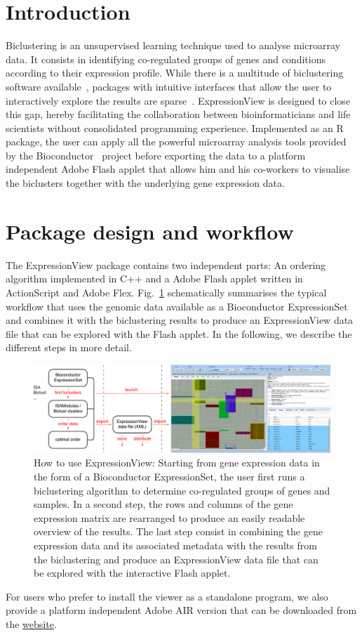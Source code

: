 \documentclass[round]{bioinfo}
\begin{document}
\section{Introduction}
Biclustering is an unsupervised learning technique used to analyse microarray data. It consists in identifying co-regulated groups of genes and conditions according to their expression profile. While there is a multitude of biclustering software available~\citep{madeira04}, packages with intuitive interfaces that allow the user to interactively explore the results are sparse~\citep{santamaria08}. ExpressionView is designed to close this gap, hereby facilitating the collaboration between bioinformaticians and life scientists without consolidated programming experience. Implemented as an R package, the user can apply all the powerful microarray analysis tools provided by the Bioconductor~\citep{gentleman04} project before exporting the data to a platform independent Adobe Flash applet that allows him and his co-workers to visualise the biclusters together with the underlying gene expression data.

\section{Package design and workflow}
The ExpressionView package contains two independent parts: An ordering algorithm implemented in C++ and a Adobe Flash applet written in ActionScript and Adobe Flex. Fig.~\ref{fig:workflow} schematically summarises the typical workflow that uses the genomic data available as a Bioconductor ExpressionSet and combines it with the biclustering results to produce an ExpressionView data file that can be explored with the Flash applet. In the following, we describe the different steps in more detail.
\begin{figure}[!tpb]
\centerline{\includegraphics[width=0.9\linewidth]{fig1-crop}}
\caption{How to use ExpressionView: Starting from gene expression data in the form of a Bioconductor ExpressionSet, the user first runs a biclustering algorithm to determine co-regulated groups of genes and samples. In a second step, the rows and columns of the gene expression matrix are rearranged to produce an easily readable overview of the results. The last step consist in combining the gene expression data and its associated metadata with the results from the biclustering and produce an ExpressionView data file that can be explored with the interactive Flash applet.}\label{fig:workflow}
\end{figure}
For users who prefer to install the viewer as a standalone program, we also provide a platform independent Adobe AIR version that can be downloaded from the \href{http://www.unil.ch/cbg/ExpressionView}{website}.
\end{document}

